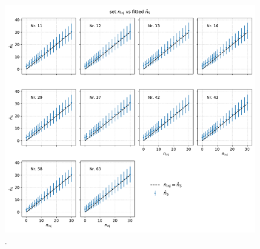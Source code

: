 \begin{figure}
    \centering
    \includegraphics[width=\linewidth]{Plots/05_csky/ns_fit_time_dep.pdf}
    \caption{.}
    \label{fig:ns_fit_time_dep}
\end{figure}
